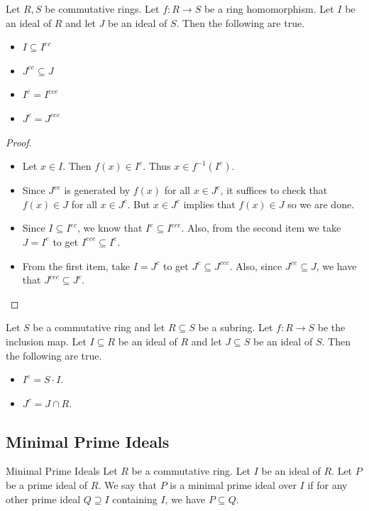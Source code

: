 \documentclass[a4paper]{article}
\begin{document}
\begin{prp}{}{} Let $R,S$ be commutative rings. Let $f:R\to S$ be a ring homomorphism. Let $I$ be an ideal of $R$ and let $J$ be an ideal of $S$. Then the following are true. 
\begin{itemize}
\item $I\subseteq I^{ec}$
\item $J^{ce}\subseteq J$
\item $I^e=I^{ece}$
\item $J^c=J^{cec}$
\end{itemize} 
\begin{proof}\\
\begin{itemize}
\item Let $x\in I$. Then $f(x)\in I^e$. Thus $x\in f^{-1}(I^e)$. 
\item Since $J^{ce}$ is generated by $f(x)$ for all $x\in J^c$, it suffices to check that $f(x)\in J$ for all $x\in J^c$. But $x\in J^c$ implies that $f(x)\in J$ so we are done. 
\item Since $I\subseteq I^{ec}$, we know that $I^e\subseteq I^{ece}$. Also, from the second item we take $J=I^e$ to get $I^{ece}\subseteq I^e$. 
\item From the first item, take $I=J^c$ to get $J^c\subseteq J^{cec}$. Also, since $J^{ce}\subseteq J$, we have that $J^{cec}\subseteq J^c$. 
\end{itemize}
\end{proof}
\end{prp}

\begin{eg}{}{} Let $S$ be a commutative ring and let $R\subseteq S$ be a subring. Let $f:R\to S$ be the inclusion map. Let $I\subseteq R$ be an ideal of $R$ and let $J\subseteq S$ be an ideal of $S$. Then the following are true. 
\begin{itemize}
\item $I^e=S\cdot I$. 
\item $J^c=J\cap R$. 
\end{itemize}
\end{eg}

\subsection{Minimal Prime Ideals}
\begin{defn}{Minimal Prime Ideals}{} Let $R$ be a commutative ring. Let $I$ be an ideal of $R$. Let $P$ be a prime ideal of $R$. We say that $P$ is a minimal prime ideal over $I$ if for any other prime ideal $Q\supseteq I$ containing $I$, we have $P\subseteq Q$. 
\end{defn}
\end{document}
